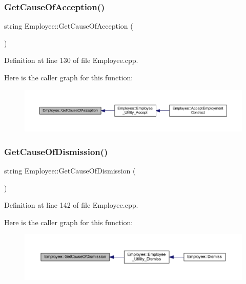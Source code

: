 \subsubsection{\texorpdfstring{Get\+Cause\+Of\+Acception()}{GetCauseOfAcception()}}
{\footnotesize\ttfamily string Employee\+::\+Get\+Cause\+Of\+Acception (\begin{DoxyParamCaption}{ }\end{DoxyParamCaption})}



Definition at line 130 of file Employee.\+cpp.

Here is the caller graph for this function\+:
\nopagebreak
\begin{figure}[H]
\begin{center}
\leavevmode
\includegraphics[width=350pt]{class_employee_a462e85cd69817614a7c9e030fb806f29_icgraph}
\end{center}
\end{figure}
\mbox{\label{class_employee_aa7e35077b13efe6cbc362dc7b561b010}} 
\subsubsection{\texorpdfstring{Get\+Cause\+Of\+Dismission()}{GetCauseOfDismission()}}
{\footnotesize\ttfamily string Employee\+::\+Get\+Cause\+Of\+Dismission (\begin{DoxyParamCaption}{ }\end{DoxyParamCaption})}



Definition at line 142 of file Employee.\+cpp.

Here is the caller graph for this function\+:
\nopagebreak
\begin{figure}[H]
\begin{center}
\leavevmode
\includegraphics[width=350pt]{class_employee_aa7e35077b13efe6cbc362dc7b561b010_icgraph}
\end{center}
\end{figure}
\mbox{\label{class_employee_ad8df9b482bc23365e06357005524c5fd}} 
